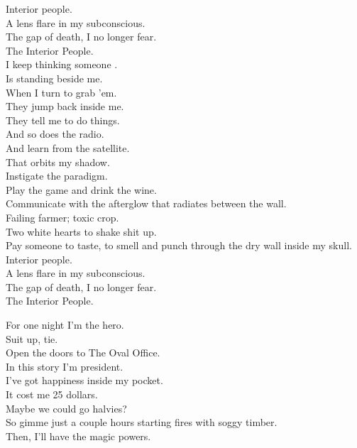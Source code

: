 Interior people. \\
A lens flare in my subconscious. \\
The gap of death, I no longer fear. \\
The Interior People. \\

I keep thinking someone .\\
Is standing beside me. \\
When I turn to grab 'em. \\
They jump back inside me. \\
They tell me to do things. \\
And so does the radio. \\
And learn from the satellite. \\
That orbits my shadow. \\

Instigate the paradigm. \\
Play the game and drink the wine. \\
Communicate with the afterglow that radiates between the wall. \\

Failing farmer; toxic crop. \\
Two white hearts to shake shit up. \\
Pay someone to taste, to smell and punch through the dry wall inside my skull. \\

Interior people. \\
A lens flare in my subconscious. \\
The gap of death, I no longer fear. \\
The Interior People. \\




For one night I'm the hero. \\
Suit up, tie. \\
Open the doors to The Oval Office. \\
In this story I'm president. \\

I've got happiness inside my pocket. \\
It cost me 25 dollars. \\
Maybe we could go halvies? \\
So gimme just a couple hours starting fires with soggy timber. \\
Then, I'll have the magic powers. \\


